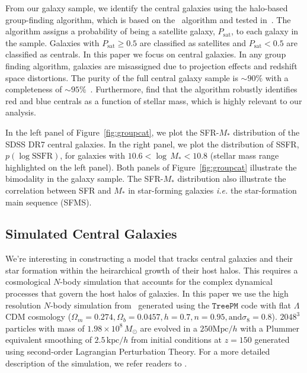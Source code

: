 \documentclass[12pt, letterpaper, preprint]{aastex}
\begin{document}
From our galaxy sample, we identify the central galaxies using the \cite{tinker2011} halo-based 
group-finding algorithm, which is based on the~\cite{yang2005} algorithm and tested 
in~\cite{campbell2015}. The algorithm assigns a probability of being a satellite 
galaxy, $P_\mathrm{sat}$, to each galaxy in the sample. Galaxies with $P_\mathrm{sat} \geq 0.5$ 
are classified as satellites and $P_\mathrm{sat} < 0.5$ are classified as centrals. 
In this paper we focus on central galaxies. In any group finding algorithm, galaxies are 
misassigned due to projection effects and redshift space distortions. The purity 
of the full central galaxy sample is $\sim 90\%$ with a completeness of $\sim 95\%$~\citep{tinker2017}.
Furthermore, \cite{campbell2015} find that the algorithm robustly identifies red and blue centrals
as a function of stellar mass, which is highly relevant to our analysis.  

In the left panel of Figure~\ref{fig:groupcat}, we plot the SFR-$M_*$ distribution of
the SDSS DR7 central galaxies. In the right panel, we plot the distribution of SSFR, 
$p(\log \mathrm{SSFR})$, for galaxies with $10.6 < \log \,M_* < 10.8$ (stellar mass range 
highlighted on the left panel). Both panels of Figure~\ref{fig:groupcat} illustrate the 
bimodality in the galaxy sample. The SFR-$M_*$ distribution also illustrate the correlation
between SFR and $M_*$ in star-forming galaxies \emph{i.e.} the star-formation main sequence 
(SFMS).

\subsection{Simulated Central Galaxies}
We're interesting in constructing a model that tracks central galaxies and their star 
formation within the heirarchical growth of their host halos. This requires a cosmological 
$N$-body simulation that accounts for the complex dynamical processes that govern the host 
halos of galaxies. In this paper we use the high resolution $N$-body simulation 
from~\cite{wetzel2013} generated using the \cite{white2002} $\mathtt{TreePM}$ code 
with flat $\Lambda$CDM cosmology 
($\Omega_m =0.274, \Omega_b = 0.0457, h = 0.7, n=0.95, \mathrm{and} \sigma_8 = 0.8$).
$2048^3$ particles with mass of $1.98 \times 10^8\,M_\odot$ are evolved in a $250 \mathrm{Mpc}/h$
with a Plummer equivalent smoothing of $2.5\,\mathrm{kpc}/h$ from initial conditions at $z = 150$ 
generated using second-order Lagrangian Perturbation Theory. For a more detailed description of 
the simulation, we refer readers to \cite{wetzel2013, wetzel2014}.
\end{document}
